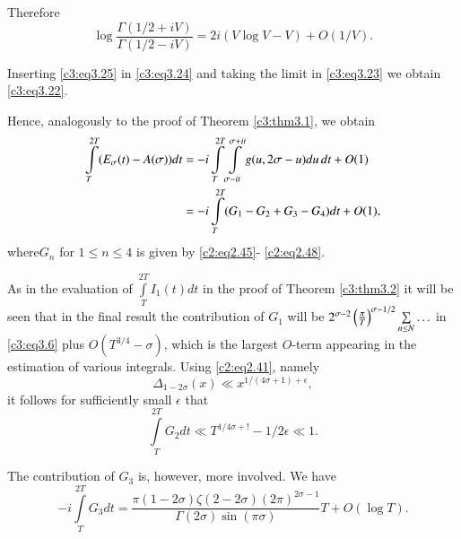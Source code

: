 Therefore
\begin{equation}
  \log \frac{\Gamma (1/2 + iV)}{\Gamma (1/2 - iV)} = 2i (V \log V -V)
  + O(1/V).\label{c3:eq3.25}
\end{equation}

Inserting \eqref{c3:eq3.25} in \eqref{c3:eq3.24} and taking the limit
in \eqref{c3:eq3.23} we obtain \eqref{c3:eq3.22}.

Hence, analogously to the proof of Theorem \ref{c3:thm3.1}, we obtain 
\begin{align}
  \int\limits_T^{2T} (E_\sigma (t) - A(\sigma))dt & = -i
  \int\limits_T^{2T} \int\limits_{\sigma - it}^{\sigma+ it} g(u, 2
  \sigma -u) du\, dt + O(1) \notag\\
  & = -i \int\limits_T^{2T} (G_1 - G_2 + G_3 - G_4) dt + O(1),\label{c3:eq3.26}
\end{align}
where\pageoriginale $G_n$ for $1 \leq n \leq 4$ is given by
\eqref{c2:eq2.45}- \eqref{c2:eq2.48}.

As in the evaluation of $\int\limits_T^{2T} I_1 (t)dt$ in the proof of
Theorem \ref{c3:thm3.2} it will be seen that in the final result the
contribution of $G_1$ will be {\small $2^{\sigma-2} \left(\frac{\pi}{T}
\right)^{\sigma -1/2}\break \sum\limits_{n \leq N} \ldots$} in
\eqref{c3:eq3.6} plus $O(T^{3/4}- \sigma)$, which is the largest
$O$-term appearing in the estimation of various integrals. Using
\eqref{c2:eq2.41},  namely
$$
\Delta_{1- 2 \sigma} (x) \ll x^{1/(4\sigma+1)+\epsilon},
$$
it follows for sufficiently small $\epsilon$ that 
$$
\int\limits_T^{2T} G_2 dt \ll T^{1/ 4 \sigma+!}- 1/2 \epsilon \ll 1.
$$

The contribution of $G_3$ is, however, more involved. We have
\begin{equation}
  - i \int\limits_T^{2T} G_3 dt = \frac{\pi (1- 2 \sigma) \zeta (2- 2
    \sigma)(2 \pi)^{2 \sigma-1}}{\Gamma (2 \sigma) \sin (\pi \sigma)}T
  + O(\log T).\label{c3:eq3.27}
\end{equation}

